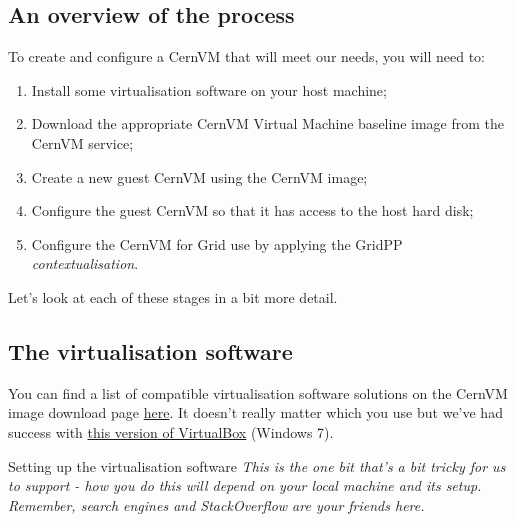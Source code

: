 \subsection{An overview of the process}
\label{an-overview-of-the-process}
To create and configure a CernVM that will meet our needs, you will need
to:

\begin{enumerate}
\def\labelenumi{\arabic{enumi}.}
\tightlist
\item
  Install some virtualisation software on your host machine;
\item
  Download the appropriate CernVM Virtual Machine baseline image from
  the CernVM service;
\item
  Create a new guest CernVM using the CernVM image;
\item
  Configure the guest CernVM so that it has access to the host hard
  disk;
\item
  Configure the CernVM for Grid use by applying the GridPP
  \emph{contextualisation}.
\end{enumerate}

Let's look at each of these stages in a bit more detail.


\subsection{The virtualisation software}
\label{the-virtualisation-software}
You can find a list of compatible virtualisation software solutions on
the CernVM image download page
\href{http://cernvm.cern.ch/portal/downloads}{here}. It doesn't really
matter which you use but we've had success with
\href{http://download.virtualbox.org/virtualbox/4.3.12/VirtualBox-4.3.12-93733-Win.exe}{this
version of VirtualBox} (Windows 7).

\begin{warningbox}{Setting up the virtualisation software}
\emph{This is the one bit that's a bit tricky for us to support - how you do
this will depend on your local machine and its setup. Remember, search
engines and StackOverflow are your friends here.}
\end{warningbox}

